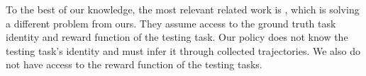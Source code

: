 To the best of our knowledge, the most relevant related work is \cite{siegel2020keep}, which is solving a different problem from ours.
They assume access to the ground truth task identity and reward function of the testing task.
Our policy does not know the testing task's identity and must infer it through collected trajectories.
We also do not have access to the reward function of the testing tasks.


